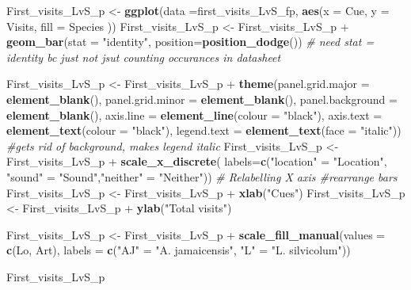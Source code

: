 \documentclass[]{article}
\newenvironment{Shaded}{\begin{snugshade}}{\end{snugshade}}
\newcommand{\KeywordTok}[1]{\textcolor[rgb]{0.13,0.29,0.53}{\textbf{{#1}}}}
\newcommand{\DataTypeTok}[1]{\textcolor[rgb]{0.13,0.29,0.53}{{#1}}}
\newcommand{\StringTok}[1]{\textcolor[rgb]{0.31,0.60,0.02}{{#1}}}
\newcommand{\CommentTok}[1]{\textcolor[rgb]{0.56,0.35,0.01}{\textit{{#1}}}}
\newcommand{\NormalTok}[1]{{#1}}
\begin{document}
\begin{Shaded}
\begin{Highlighting}[]
\NormalTok{First_visits_LvS_p <-}\StringTok{ }\KeywordTok{ggplot}\NormalTok{(}\DataTypeTok{data =}\NormalTok{first_visits_LvS_fp, }\KeywordTok{aes}\NormalTok{(}\DataTypeTok{x =} \NormalTok{Cue, }\DataTypeTok{y =} \NormalTok{Visits, }\DataTypeTok{fill =} \NormalTok{Species ))}
\NormalTok{First_visits_LvS_p <-}\StringTok{ }\NormalTok{First_visits_LvS_p +}\StringTok{ }\KeywordTok{geom_bar}\NormalTok{(}\DataTypeTok{stat =} \StringTok{"identity"}\NormalTok{, }\DataTypeTok{position=}\KeywordTok{position_dodge}\NormalTok{()) }\CommentTok{# need stat = identity bc just not jsut counting occurances in datasheet}

\NormalTok{First_visits_LvS_p  <-}\StringTok{ }\NormalTok{First_visits_LvS_p  +}\StringTok{ }\KeywordTok{theme}\NormalTok{(}\DataTypeTok{panel.grid.major =} \KeywordTok{element_blank}\NormalTok{(), }\DataTypeTok{panel.grid.minor =} \KeywordTok{element_blank}\NormalTok{(),}
\DataTypeTok{panel.background =} \KeywordTok{element_blank}\NormalTok{(), }\DataTypeTok{axis.line =} \KeywordTok{element_line}\NormalTok{(}\DataTypeTok{colour =} \StringTok{"black"}\NormalTok{), }\DataTypeTok{axis.text =} \KeywordTok{element_text}\NormalTok{(}\DataTypeTok{colour =} \StringTok{"black"}\NormalTok{), }\DataTypeTok{legend.text =} \KeywordTok{element_text}\NormalTok{(}\DataTypeTok{face =} \StringTok{"italic"}\NormalTok{))  }\CommentTok{#gets rid of background, makes legend italic}
\NormalTok{First_visits_LvS_p  <-}\StringTok{ }\NormalTok{First_visits_LvS_p  +}\StringTok{ }\KeywordTok{scale_x_discrete}\NormalTok{( }\DataTypeTok{labels=}\KeywordTok{c}\NormalTok{(}\StringTok{"location"} \NormalTok{=}\StringTok{ "Location"}\NormalTok{, }\StringTok{"sound"} \NormalTok{=}\StringTok{ "Sound"}\NormalTok{,}\StringTok{"neither"} \NormalTok{=}\StringTok{ "Neither"}\NormalTok{))  }\CommentTok{# Relabelling X axis #rearrange bars}
\NormalTok{First_visits_LvS_p  <-}\StringTok{ }\NormalTok{First_visits_LvS_p  +}\StringTok{ }\KeywordTok{xlab}\NormalTok{(}\StringTok{"Cues"}\NormalTok{)}
\NormalTok{First_visits_LvS_p  <-}\StringTok{ }\NormalTok{First_visits_LvS_p  +}\StringTok{ }\KeywordTok{ylab}\NormalTok{(}\StringTok{"Total visits"}\NormalTok{)}

\NormalTok{First_visits_LvS_p  <-}\StringTok{ }\NormalTok{First_visits_LvS_p  +}\StringTok{ }\KeywordTok{scale_fill_manual}\NormalTok{(}\DataTypeTok{values =} \KeywordTok{c}\NormalTok{(Lo, Art), }\DataTypeTok{labels =} \KeywordTok{c}\NormalTok{(}\StringTok{"AJ"} \NormalTok{=}\StringTok{ "A. jamaicensis"}\NormalTok{, }\StringTok{"L"} \NormalTok{=}\StringTok{ "L. silvicolum"}\NormalTok{))}

\NormalTok{First_visits_LvS_p}
\end{Highlighting}
\end{Shaded}
\end{document}
